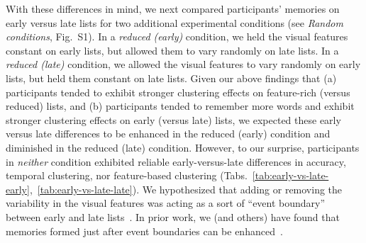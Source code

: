 \documentclass[11pt]{article}
\newcommand{\dynamicsRandom}{S1}
\newcommand{\abbreviations}{S1}
\begin{document}
With these differences in mind, we next compared participants' memories on
early versus late lists for two additional experimental conditions (see
\textit{Random conditions}, Fig.~\dynamicsRandom). In a \textit{reduced
(early)} condition, we held the visual features constant on early lists, but
allowed them to vary randomly on late lists. In a \textit{reduced (late)}
condition, we allowed the visual features to vary randomly on early lists, but
held them constant on late lists. Given our above findings that (a)
participants tended to exhibit stronger clustering effects on feature-rich
(versus reduced) lists, and (b) participants tended to remember more words and
exhibit stronger clustering effects on early (versus late) lists, we expected
these early versus late differences to be enhanced in the reduced (early)
condition and diminished in the reduced (late) condition. However, to our
surprise, participants in \textit{neither} condition exhibited reliable
early-versus-late differences in accuracy, temporal clustering, nor
feature-based clustering
(Tabs.~\ref{tab:early-vs-late-early},~\ref{tab:early-vs-late-late}). We
hypothesized that adding or removing the variability in the visual features was
acting as a sort of ``event boundary'' between early and late
lists~\citep[e.g.,][]{ClewEtal19,RadvZack17,RadvCope06}. In prior work, we (and
others) have found that memories formed just after event boundaries can be
enhanced~\citep[e.g., due to less contextual interference between pre- and
post-boundary items;][]{MannEtal16, PettEtal16, GoldEtal17, FlorEtal17}.

\begin{table}[tp]
\centering
\tiny


\caption{\textbf{Comparing memory in the feature-rich versus reduced (early)
conditions (all lists).} The independent samples $t$-tests reported in the
table were carried out across-participants, and reflect data aggregated across
all lists from each participant. Abbreviations used in this table are defined
in Table~\abbreviations.}

\label{tab:feature-rich-vs-reduced-early}
\end{table}

\begin{table}[tp]
\centering
\tiny


\caption{\textbf{Comparing memory in the reduced versus reduced (early)
conditions (all lists).} The independent samples $t$-tests reported in the
table were carried out across-participants, and reflect data aggregated across
all lists from each participant. Abbreviations used in this table are defined
in Table~\abbreviations.}

\label{tab:reduced-vs-reduced-early}
\end{table}
\end{document}
